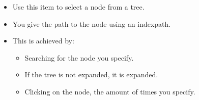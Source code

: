 \begin{itemize}
\item Use this item to select a node from a tree.
\item You give the path to the node using an indexpath.
\item This is achieved by:
\begin{itemize}
\item Searching for the node you specify.
\item If the tree is not expanded, it is expanded.
\item Clicking on the node, the amount of times you specify. 
\end{itemize}
\end{itemize}
